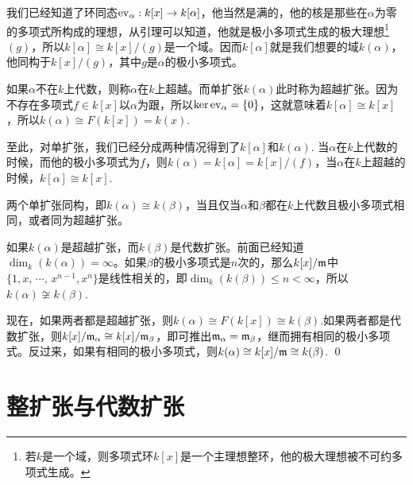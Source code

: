 我们已经知道了环同态$\operatorname{ev}_\alpha:k[x]\to k[\alpha]$，他当然是满的，他的核是那些在$\alpha$为零的多项式所构成的理想，从引理可以知道，他就是极小多项式生成的极大理想\footnote{若$k$是一个域，则多项式环$k[x]$是一个主理想整环，他的极大理想被不可约多项式生成。}$(g)$，所以$k[\alpha]\cong k[x]/(g)$是一个域。因而$k[\alpha]$就是我们想要的域$k(\alpha)$，他同构于$k[x]/(g)$，其中$g$是$\alpha$的极小多项式。

\para 如果$\alpha$不在$k$上代数，则称$\alpha$在$k$上超越。而单扩张$k(\alpha)$此时称为超越扩张。因为不存在多项式$f\in k[x]$以$\alpha$为跟，所以$\ker \operatorname{ev}_\alpha=\{0\}$，这就意味着$k[\alpha]\cong k[x]$，所以$k(\alpha)\cong F(k[x])=k(x)$.

至此，对单扩张，我们已经分成两种情况得到了$k[\alpha]$和$k(\alpha)$. 当$\alpha$在$k$上代数的时候，而他的极小多项式为$f$，则$k(\alpha)=k[\alpha]=k[x]/(f)$，当$\alpha$在$k$上超越的时候，$k[\alpha]\cong k[x]$.



\pro 两个单扩张同构，即$k(\alpha)\cong k(\beta)$，当且仅当$\alpha$和$\beta$都在$k$上代数且极小多项式相同，或者同为超越扩张。

\proof 
	如果$k(\alpha)$是超越扩张，而$k(\beta)$是代数扩张。前面已经知道$\dim_k(k(\alpha))=\infty$。如果$\beta$的极小多项式是$n$次的，那么$k[x]/\mathfrak{m}$中$\{1,x,\,\cdots,\,x^{n-1},x^n\}$是线性相关的，即$\dim_k(k(\beta))\leq n<\infty$，所以$k(\alpha)\not\cong k(\beta)$.

	现在，如果两者都是超越扩张，则$k(\alpha)\cong F(k[x])\cong k(\beta)$.如果两者都是代数扩张，则$k[x]/\mathfrak{m}_\alpha\cong k[x]/\mathfrak{m}_\beta$，即可推出$\mathfrak{m}_\alpha=\mathfrak{m}_\beta$，继而拥有相同的极小多项式。反过来，如果有相同的极小多项式，则$k(\alpha)\cong k[x]/\mathfrak{m}\cong k(\beta)$.
\qed


\section{整扩张与代数扩张}

